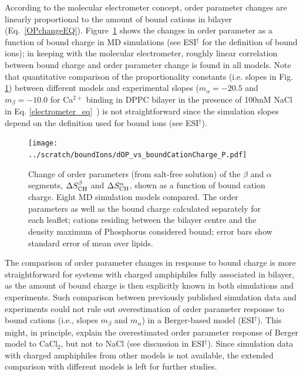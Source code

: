 \documentclass[twoside,twocolumn,9pt]{article}
\begin{document}
According to the molecular electrometer concept, order parameter changes are linearly proportional to
the amount of bound cations in bilayer (Eq.~\eqref{OPchangeEQ}).
Figure~\ref{electrometer} shows the changes in order parameter as a function of bound charge in MD simulations
(see ESI$^\dag$ for the definition of bound ions);
in keeping with the molecular electrometer, roughly linear correlation between bound charge and order parameter change is found in all models.
Note that quantitative comparison of the proportionality constants (i.e. slopes in Fig. \ref{electrometer})
between different models and experimental slopes
($m_\alpha=-20.5$ and $m_\beta=-10.0$ for Ca$^{2+}$ binding in DPPC bilayer in
the presence of 100mM NaCl in Eq. \ref{electrometer_eq}~\cite{altenbach84}) is not straightforward 
since the simulation slopes depend on the definition used for bound ions (see ESI$^\dag$).
\begin{figure}[t]
  \centering
  \texttt{[image: ../scratch/boundIons/dOP\_vs\_boundCationCharge\_P.pdf]}
  \caption{\label{electrometer}
    Change of order parameters (from salt-free solution) of the $\beta$ and $\alpha$ segments,
    $\Delta S_{\rm{CH}}^{\beta}$ and $\Delta S_{\rm{CH}}^{\alpha}$,
    shown as a function of bound cation charge.
    Eight MD simulation models compared.
    The order parameters as well as the bound charge calculated separately for
    each leaflet; cations residing between the bilayer centre and the density maximum of Phosphorus
    considered bound; error bars show standard error of mean over lipids.
   }
\end{figure}

The comparison of order parameter changes in response to bound charge is more straightforward for
systems with charged amphiphiles fully associated in bilayer, as the amount of bound charge
is then explicitly known in both simulations and experiments. Such comparison
between previously published simulation data \cite{miettinen09} and experiments \cite{scherer89,franzin98}
could not rule out
overestimation of order parameter response to bound cations (i.e., slopes $m_\beta$ and $m_\alpha$)
in a Berger-based model (ESI$^\dag$).
This might, in principle, explain the overestimated order parameter 
response of Berger model to CaCl$_2$, but not to NaCl (see discussion in ESI$^\dag$).
Since simulation data with charged amphiphiles from other models is not available,
the extended comparison with different models is left for further studies.
\end{document}
